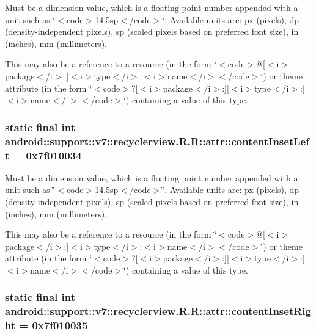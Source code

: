 Must be a dimension value, which is a floating point number appended with a unit such as \char`\"{}$<$code$>$14.5sp$<$/code$>$\char`\"{}. Available units are: px (pixels), dp (density-independent pixels), sp (scaled pixels based on preferred font size), in (inches), mm (millimeters). 

This may also be a reference to a resource (in the form \char`\"{}$<$code$>$@\mbox{[}$<$i$>$package$<$/i$>$:\mbox{]}$<$i$>$type$<$/i$>$:$<$i$>$name$<$/i$>$$<$/code$>$\char`\"{}) or theme attribute (in the form \char`\"{}$<$code$>$?\mbox{[}$<$i$>$package$<$/i$>$:\mbox{]}\mbox{[}$<$i$>$type$<$/i$>$:\mbox{]}$<$i$>$name$<$/i$>$$<$/code$>$\char`\"{}) containing a value of this type. \hypertarget{classandroid_1_1support_1_1v7_1_1recyclerview_1_1_r_1_1attr_c09181bf7f5fb10a01dd76c57d9eb239}{
\subsubsection[{contentInsetLeft}]{\setlength{\rightskip}{0pt plus 5cm}static final int android::support::v7::recyclerview.R.R::attr::contentInsetLeft = 0x7f010034}}
\label{classandroid_1_1support_1_1v7_1_1recyclerview_1_1_r_1_1attr_c09181bf7f5fb10a01dd76c57d9eb239}


Must be a dimension value, which is a floating point number appended with a unit such as \char`\"{}$<$code$>$14.5sp$<$/code$>$\char`\"{}. Available units are: px (pixels), dp (density-independent pixels), sp (scaled pixels based on preferred font size), in (inches), mm (millimeters). 

This may also be a reference to a resource (in the form \char`\"{}$<$code$>$@\mbox{[}$<$i$>$package$<$/i$>$:\mbox{]}$<$i$>$type$<$/i$>$:$<$i$>$name$<$/i$>$$<$/code$>$\char`\"{}) or theme attribute (in the form \char`\"{}$<$code$>$?\mbox{[}$<$i$>$package$<$/i$>$:\mbox{]}\mbox{[}$<$i$>$type$<$/i$>$:\mbox{]}$<$i$>$name$<$/i$>$$<$/code$>$\char`\"{}) containing a value of this type. \hypertarget{classandroid_1_1support_1_1v7_1_1recyclerview_1_1_r_1_1attr_6e318cbd8278d09ec6b37690a3545abe}{
\subsubsection[{contentInsetRight}]{\setlength{\rightskip}{0pt plus 5cm}static final int android::support::v7::recyclerview.R.R::attr::contentInsetRight = 0x7f010035}}
\label{classandroid_1_1support_1_1v7_1_1recyclerview_1_1_r_1_1attr_6e318cbd8278d09ec6b37690a3545abe}


